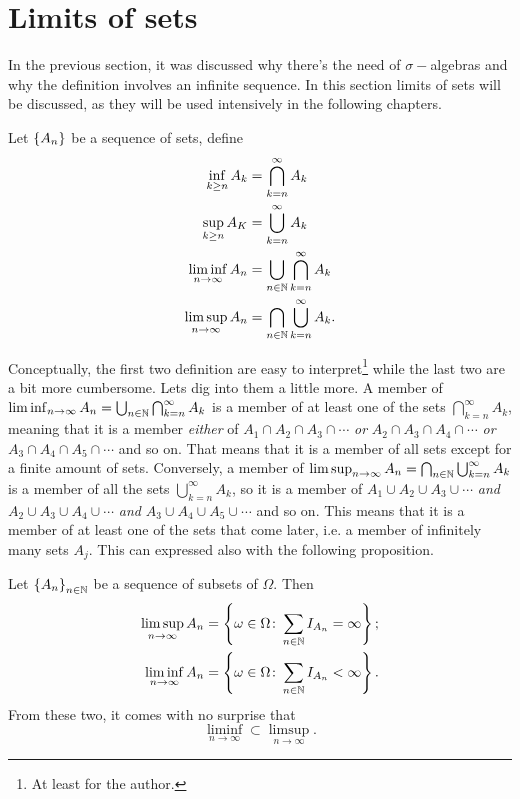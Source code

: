 \section{Limits of sets}
In the previous section, it was discussed why there's the need of $\sigma-$algebras and why the definition involves an infinite sequence. In this section limits of sets will be discussed, as they will be used intensively in the following chapters.
\begin{definition}
    Let $\left\lbrace A_{n} \right\rbrace$ be a sequence of sets, define
    \begin{align}
        \inf_{k\geq n} A_{k} &= \bigcap_{k=n}^{\infty}A_{k} \\
        \sup_{k\geq n} A_{K} &= \bigcup_{k=n}^{\infty}A_{k} \\
        \liminf_{n\rightarrow\infty} A_{n} &= \bigcup_{n\in\mathbb{ N}}\bigcap_{k=n}^{\infty}A_{k} \\
        \limsup_{n\rightarrow\infty} A_{n} &= \bigcap_{n\in\mathbb{ N}}\bigcup_{k=n}^{\infty}A_{k}.
    \end{align}
\end{definition}
Conceptually, the first two definition are easy to interpret\footnote{At least for the author.} while the last two are a bit more cumbersome. Lets dig into them a little more. A member of $\liminf_{n\rightarrow\infty} A_{n} =\bigcup_{n\in\mathbb{ N}}\bigcap_{k=n}^{\infty}A_{k}$ is a member of at least one of the sets $\bigcap_{k=n}^{\infty}A_{k}$, meaning that it is a member \textit{either} of $A_{1}\cap A_{2}\cap A_{3}\cap \cdots$ \textit{or} $A_{2}\cap A_{3}\cap A_{4}\cap \cdots$ \textit{or} $A_{3}\cap A_{4}\cap A_{5}\cap \cdots$ and so on. That means that it is a member of all sets except for a finite amount of sets. Conversely, a member of $\limsup_{n\rightarrow\infty} A_{n}=\bigcap_{n\in\mathbb{ N}}\bigcup_{k=n}^{\infty}A_{k}$ is a member of all the sets $\bigcup_{k=n}^{\infty}A_{k}$, so it is a member of $A_{1}\cup A_{2}\cup A_{3}\cup \cdots$ \textit{and} $A_{2}\cup A_{3}\cup A_{4}\cup \cdots$ \textit{and} $A_{3}\cup A_{4}\cup A_{5}\cup \cdots$ and so on. This means that it is a member of at least one of the sets that come later, i.e. a member of infinitely many sets $A_{j}$. This can expressed also with the following proposition.
\begin{proposition}
    Let $\left\lbrace A_{n} \right\rbrace_{n\in\mathbb{ N}}$ be a sequence of subsets of $\Omega$. Then
    \begin{align*}
        \limsup_{n\rightarrow\infty} A_{n} &= \left\lbrace \omega\in\Omega \colon \sum_{n\in\mathbb{ N}}I_{A_{n}} = \infty \right\rbrace;\\
        \liminf_{n\rightarrow\infty} A_{n} &= \left\lbrace \omega\in\Omega \colon \sum_{n\in\mathbb{ N}}I_{A_{n}} < \infty \right\rbrace.
    \end{align*}
    From these two, it comes with no surprise that
    \begin{equation*}
        \liminf_{n\rightarrow\infty} \subset \limsup_{n\rightarrow\infty}.
    \end{equation*}
\end{proposition}


